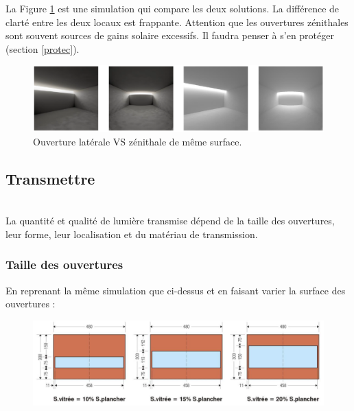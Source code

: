 \documentclass[11pt]{report}
\begin{document}
La Figure \ref{incl} est une simulation qui compare les deux solutions. La différence de clarté entre les deux locaux est frappante. Attention que les ouvertures zénithales sont souvent sources de gains solaire excessifs. Il faudra penser à s'en protéger (section \ref{protec}).

\begin{figure}[h]
\centering
\includegraphics[width=\linewidth]{incl}
\caption{Ouverture latérale VS zénithale de même surface.}
\label{incl}
\end{figure}











\newpage
\subsection{Transmettre}
\\

La quantité et qualité de lumière transmise dépend de la taille des ouvertures, leur forme, leur localisation et du matériau de transmission.

\subsubsection{Taille des ouvertures}
En reprenant la même simulation que ci-dessus et en faisant varier la surface des ouvertures :
\begin{figure}[h]
\centering
\includegraphics[width=0.6\linewidth]{svi}
\end{figure}
\end{document}
